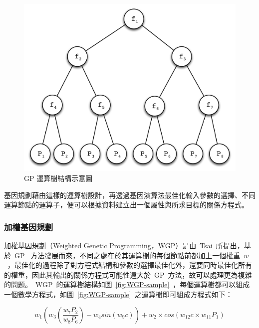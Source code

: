 \begin{figure}[hbtp]
  \begin{center}
    \includegraphics[width=1.0\textwidth]{figures/gp-struct.pdf}
    \caption{GP 運算樹結構示意圖} 
    \label{fig:GP-struct}
  \end{center}
\end{figure}

基因規劃藉由這樣的運算樹設計，再透過基因演算法最佳化輸入參數的選擇、不同運算節點的運算子，便可以根據資料建立出一個屬性與所求目標的關係方程式。

\subsubsection{加權基因規劃}

加權基因規劃（Weighted Genetic Programming，WGP）是由~Tsai\cite{tsai2011predicting}~所提出，基於~GP~ 方法發展而來，不同之處在於其運算樹的每個節點前都加上一個權重~$w$~，最佳化的過程除了對方程式結構和參數的選擇最佳化外，還要同時最佳化所有的權重，因此其輸出的關係方程式可能性遠大於~GP~方法，故可以處理更為複雜的問題。~WGP~的運算樹結構如圖~\ref{fig:WGP-sample}~，每個運算樹都可以組成一個數學方程式，如圖~\ref{fig:WGP-sample}~之運算樹即可組成方程式如下：

\begin{equation} w_1(w_3(\dfrac{w_7P_2}{w_8P_6}) - w_4sin(w_9c))+w_2 \times cos(w_{12}c \times w_{11}P_1) \label{eq:WGP-sample}\end{equation} 


